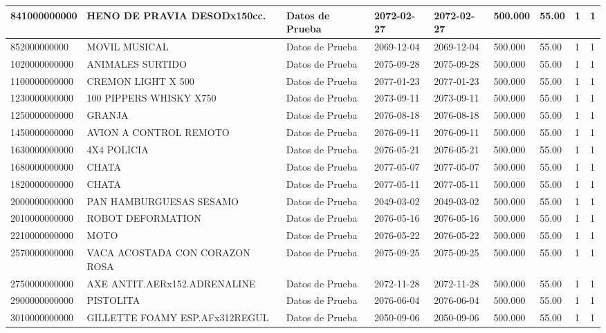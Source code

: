 \documentclass[a4paper,12pt]{article}
\begin{document}
\begin{landscape}
\begin{longtable}{|p{4cm}|p{2.5cm}|p{2.5cm}|p{1.8cm}|p{1.8cm}|p{1cm}|p{1cm}|p{3cm}|p{3cm}||}
841000000000 & HENO DE PRAVIA DESODx150cc. & Datos de Prueba & 2072-02-27 & 2072-02-27 & 500.000 & 55.00 & 1 & 1 \\ \hline 
852000000000 & MOVIL MUSICAL & Datos de Prueba & 2069-12-04 & 2069-12-04 & 500.000 & 55.00 & 1 & 1 \\ \hline 
1020000000000 & ANIMALES SURTIDO & Datos de Prueba & 2075-09-28 & 2075-09-28 & 500.000 & 55.00 & 1 & 1 \\ \hline 
1100000000000 & CREMON LIGHT X 500 & Datos de Prueba & 2077-01-23 & 2077-01-23 & 500.000 & 55.00 & 1 & 1 \\ \hline 
1230000000000 & 100 PIPPERS WHISKY X750 & Datos de Prueba & 2073-09-11 & 2073-09-11 & 500.000 & 55.00 & 1 & 1 \\ \hline 
1250000000000 & GRANJA & Datos de Prueba & 2076-08-18 & 2076-08-18 & 500.000 & 55.00 & 1 & 1 \\ \hline 
1450000000000 & AVION A CONTROL REMOTO & Datos de Prueba & 2076-09-11 & 2076-09-11 & 500.000 & 55.00 & 1 & 1 \\ \hline 
1630000000000 & 4X4 POLICIA & Datos de Prueba & 2076-05-21 & 2076-05-21 & 500.000 & 55.00 & 1 & 1 \\ \hline 
1680000000000 & CHATA & Datos de Prueba & 2077-05-07 & 2077-05-07 & 500.000 & 55.00 & 1 & 1 \\ \hline 
1820000000000 & CHATA & Datos de Prueba & 2077-05-11 & 2077-05-11 & 500.000 & 55.00 & 1 & 1 \\ \hline 
2000000000000 & PAN HAMBURGUESAS SESAMO & Datos de Prueba & 2049-03-02 & 2049-03-02 & 500.000 & 55.00 & 1 & 1 \\ \hline 
2010000000000 & ROBOT DEFORMATION & Datos de Prueba & 2076-05-16 & 2076-05-16 & 500.000 & 55.00 & 1 & 1 \\ \hline 
2210000000000 & MOTO & Datos de Prueba & 2076-05-22 & 2076-05-22 & 500.000 & 55.00 & 1 & 1 \\ \hline 
2570000000000 & VACA ACOSTADA CON CORAZON ROSA & Datos de Prueba & 2075-09-25 & 2075-09-25 & 500.000 & 55.00 & 1 & 1 \\ \hline 
2750000000000 & AXE ANTIT.AERx152.ADRENALINE & Datos de Prueba & 2072-11-28 & 2072-11-28 & 500.000 & 55.00 & 1 & 1 \\ \hline 
2900000000000 & PISTOLITA & Datos de Prueba & 2076-06-04 & 2076-06-04 & 500.000 & 55.00 & 1 & 1 \\ \hline 
3010000000000 & GILLETTE FOAMY ESP.AFx312REGUL & Datos de Prueba & 2050-09-06 & 2050-09-06 & 500.000 & 55.00 & 1 & 1 \\ \hline 

\end{longtable}
\end{landscape}
\end{document}
